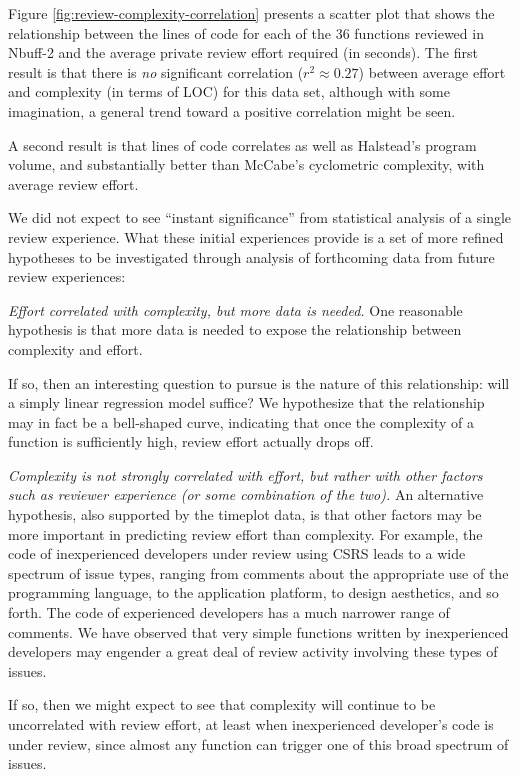 Figure \ref{fig:review-complexity-correlation} presents a scatter plot that
shows the relationship between the lines of code for each of the 36
functions reviewed in Nbuff-2 and the average private review effort
required (in seconds). The first result is that there is {\em no}
significant correlation ($r^{2} \approx 0.27$) between average effort and
complexity (in terms of LOC) for this data set, although with some
imagination, a general trend toward a positive correlation might be seen.

A second result is that lines of code correlates as well as Halstead's
program volume, and substantially better than McCabe's cyclometric
complexity, with average review effort. 

We did not expect to see ``instant significance'' from statistical analysis
of a single review experience.  What these initial experiences provide is
a set of more refined hypotheses to be investigated through analysis of 
forthcoming data from future review experiences:

\begin{itemizenoindent}
\item {\em Effort correlated with complexity, but more data is
  needed.} One reasonable hypothesis is that more data is needed to expose
  the relationship between complexity and effort.  
  
  If so, then an interesting question to pursue is the nature of this
  relationship: will a simply linear regression model suffice?  We
  hypothesize that the relationship may in fact be a bell-shaped curve,
  indicating that once the complexity of a function is sufficiently high,
  review effort actually drops off.
  
\item {\em Complexity is not strongly correlated with effort, but rather
  with other factors such as reviewer experience (or some combination of
  the two).} An alternative hypothesis, also supported by the timeplot
  data, is that other factors may be more important in predicting review
  effort than complexity.  For example, the code of inexperienced
  developers under review using CSRS leads to a wide spectrum of issue
  types, ranging from comments about the appropriate use of the programming
  language, to the application platform, to design aesthetics, and so
  forth.  The code of experienced developers has a much narrower range of
  comments.  We have observed that very simple functions written by
  inexperienced developers may engender a great deal of review activity
  involving these types of issues.

  If so, then we might expect to see that complexity will continue to be
  uncorrelated with review effort, at least when inexperienced developer's
  code is under review, since almost any function can trigger one of this
  broad spectrum of issues. 
\end{itemizenoindent}

